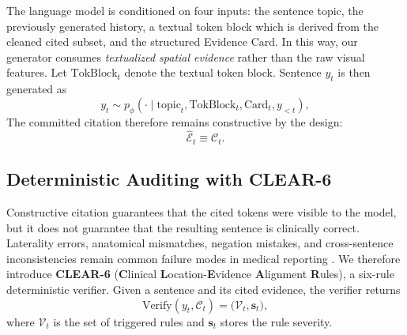 The language model is conditioned on four inputs: the sentence topic, the previously generated history, a textual token block which is derived from the cleaned cited subset, and the structured Evidence Card. In this way, our generator consumes \emph{textualized spatial evidence} rather than the raw visual features. Let $\mathrm{TokBlock}_t$ denote the textual token block. Sentence $y_t$ is then generated as
\begin{equation}
y_t \sim p_{\phi}\!\left(\cdot \mid \mathrm{topic}_t,\mathrm{TokBlock}_t,\mathrm{Card}_t,y_{<t}\right),
\label{eq:generation_new_v2}
\end{equation}
The committed citation therefore remains constructive by the design:
\begin{equation}
\hat{\mathcal{E}}_t \equiv \mathcal{C}_t.
\label{eq:constructive_new_v2}
\end{equation}



\subsection{Deterministic Auditing with \textsc{CLEAR}-6}
\label{sec:clear6}

Constructive citation guarantees that the cited tokens were visible to the model, but it does not guarantee that the resulting sentence is clinically correct. Laterality errors, anatomical mismatches, negation mistakes, and cross-sentence inconsistencies remain common failure modes in medical reporting \cite{lee2015laterality,dhuliawala2023cove}. We therefore introduce \textbf{\textsc{CLEAR}-6} (\textbf{C}linical \textbf{L}ocation-\textbf{E}vidence \textbf{A}lignment \textbf{R}ules), a six-rule deterministic verifier. Given a sentence and its cited evidence, the verifier returns
\begin{equation}
\mathrm{Verify}(y_t,\mathcal{C}_t)=\big(\mathcal{V}_t,\mathbf{s}_t\big),
\label{eq:verify_new_v2}
\end{equation}
where $\mathcal{V}_t$ is the set of triggered rules and $\mathbf{s}_t$ stores the rule severity.


